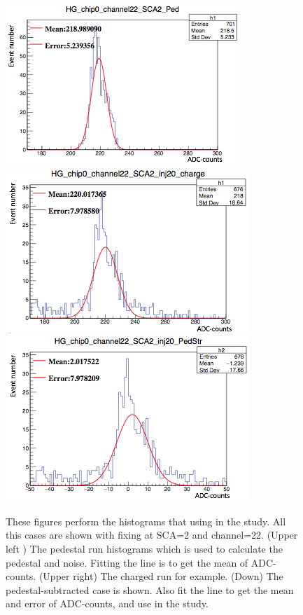 \begin{figure}[!htb]
\centering
     \includegraphics[width=\cmsFigWidth]{PCB_study/His_Pedestal.png}
     \includegraphics[width=\cmsFigWidth]{PCB_study/His_charge.png}\\
     \includegraphics[width=\cmsFigWidth]{PCB_study/His_subtraction.png}
\caption{These figures perform the histograms that using in the study. All this cases are shown with fixing at SCA=2 and channel=22. (Upper left ) The pedestal run histograms which is used to calculate the pedestal and noise. Fitting the line is to get the mean of ADC-counts. (Upper right)  The charged run for example. (Down) The pedestal-subtracted case is shown. Also fit the line to get the mean and error of ADC-counts, and use in the study.}
\label{fig:PCB_His}
\end{figure}

